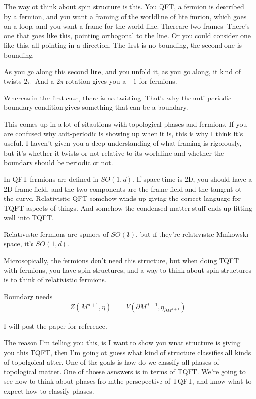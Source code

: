 The way ot think about spin structure is this.
You QFT,
a fermion is described by a fermion,
and you want a framing of the worldline of hte fmrion,
which goes on a loop,
and you want a frame for the world line.
Thereare two frames.
There's one that goes like this,
pointing orthogonal to the line.
Or you could consider one like this, all pointing in a direction.
The first is no-bounding,
the second one is bounding.

As you go along this second line,
and you unfold it,
as you go along, it kind of twists $2\pi$.
And a $2\pi$ rotation gives you a $-1$ for fermions.

Whereas in the first case, there is no twisting.
That's why the anti-periodic boundary condition gives something that can be a
boundary.

This comes up in a lot of sitautions with topological phases and fermions.
If you are confused why anit-periodic is showing up when it is,
this is why I think it's useful.
I haven't given you a deep understanding of what framing is rigorously,
but it's whether it twists or not relative to its worldline and whether the
boundary should be periodic or not.

In QFT fermions are defined in $SO(1,d)$.
If space-time is 2D,
you should have a 2D frame field,
and the two components are the frame field and the tangent ot the curve.
Relativisitc QFT somehow winds up giving the correct language for TQFT aspects
of things.
And somehow the condensed matter stuff
ends up fitting well into TQFT.

Relativistic fermions are spinors of $SO(3)$,
but if they're relativistic Minkowski space,
it's $SO(1,d)$.

Microsopically,
the fermions don't need this structure,
but when doing TQFT with fermions,
you have spin structures,
and a way to think about spin structures is to think of relativistic
fermions.

Boundary needs
\begin{align}
    Z\left( M^{d+1}, \eta \right) &=
    V\left( \partial M^{d + 1}, \eta_{\partial M^{d+1}} \right)
\end{align}

I will post the paper for reference.

The reason I'm telling you this,
is I want to show you wnat structure is giving you this TQFT,
then I'm going ot guess what kind of structure classifies all kinds of
topolgoical atter.
One of the goals is how do we classify all phases of topological matter.
One of thoese asnswers is in terms of TQFT.
We're going to see how to think about phases fro mthe persepective of TQFT,
and know what to expect how to classify phases.
